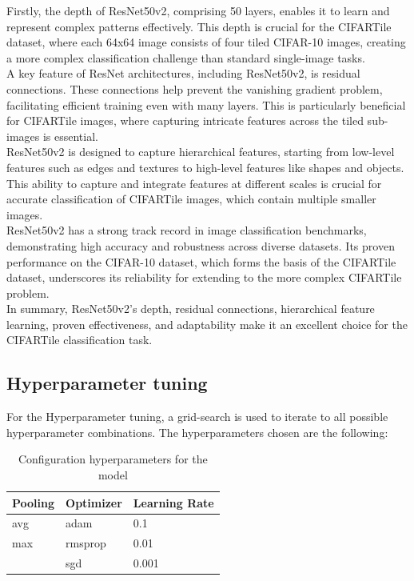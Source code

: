 \documentclass{article}
\begin{document}
Firstly, the depth of ResNet50v2, comprising 50 layers, enables it to 
learn and represent complex patterns effectively. This depth is crucial 
for the CIFARTile dataset, where each 64x64 image consists of four tiled 
CIFAR-10 images, creating a more complex classification challenge than 
standard single-image tasks.\\

A key feature of ResNet architectures, including ResNet50v2, is residual
connections. These connections help prevent the vanishing gradient problem,
facilitating efficient training even with many layers. This is particularly 
beneficial for CIFARTile images, where capturing intricate features across 
the tiled sub-images is essential.\\

ResNet50v2 is designed to capture hierarchical features, starting from
low-level features such as edges and textures to high-level features 
like shapes and objects. This ability to capture and integrate features 
at different scales is crucial for accurate classification of CIFARTile 
images, which contain multiple smaller images.\\

ResNet50v2 has a strong track record in image classification benchmarks,
demonstrating high accuracy and robustness across diverse datasets. 
Its proven performance on the CIFAR-10 dataset, which forms the basis 
of the CIFARTile dataset, underscores its reliability for extending 
to the more complex CIFARTile problem.\\

In summary, ResNet50v2’s depth, residual connections, hierarchical
feature learning, proven effectiveness, and adaptability make it
an excellent choice for the CIFARTile classification task.

\subsection{Hyperparameter tuning}

For the Hyperparameter tuning, a grid-search is used to iterate to all
possible hyperparameter combinations. The hyperparameters chosen are the following:

\begin{table}[h]
    \centering
    \begin{tabular}{@{} lll @{}}
        \toprule
        \textbf{Pooling} & \textbf{Optimizer} & \textbf{Learning Rate} \\
        \midrule
        avg             & adam               & 0.1            \\
        max             & rmsprop            & 0.01           \\
                        & sgd                & 0.001          \\
        \bottomrule
    \end{tabular}
    \caption{Configuration hyperparameters for the model}
    \label{tab:config_hyperparameter}
\end{table}
\end{document}
